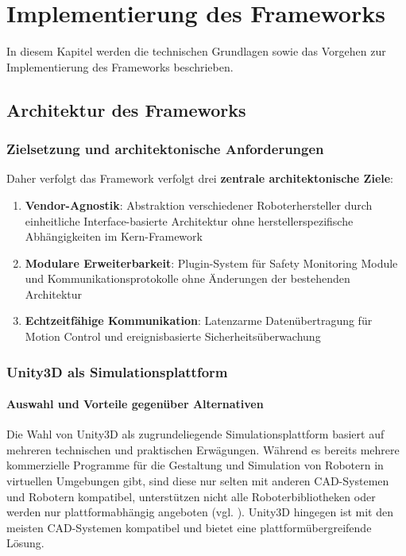 \chapter{Implementierung des Frameworks}
\label{cap:framework}
In diesem Kapitel werden die technischen Grundlagen sowie das Vorgehen zur Implementierung des Frameworks beschrieben.

\section{Architektur des Frameworks}
\label{sec:architektur_frameowork}

\subsection{Zielsetzung und architektonische Anforderungen}

Daher verfolgt das Framework verfolgt drei \textbf{zentrale architektonische
    Ziele}:

\begin{enumerate}
    \item \textbf{Vendor-Agnostik}: Abstraktion verschiedener Roboterhersteller durch einheitliche Interface-basierte Architektur ohne herstellerspezifische Abhängigkeiten im Kern-Framework

    \item \textbf{Modulare Erweiterbarkeit}: Plugin-System für Safety Monitoring Module und Kommunikationsprotokolle ohne Änderungen der bestehenden Architektur

    \item \textbf{Echtzeitfähige Kommunikation}: Latenzarme Datenübertragung für Motion Control und ereignisbasierte Sicherheitsüberwachung
\end{enumerate}

\subsection{Unity3D als Simulationsplattform}

\subsubsection{Auswahl und Vorteile gegenüber Alternativen}

Die Wahl von Unity3D als zugrundeliegende Simulationsplattform basiert auf
mehreren technischen und praktischen Erwägungen. Während es bereits mehrere
kommerzielle Programme für die Gestaltung und Simulation von Robotern in
virtuellen Umgebungen gibt, sind diese nur selten mit anderen CAD-Systemen und
Robotern kompatibel, unterstützen nicht alle Roboterbibliotheken oder werden
nur plattformabhängig angeboten (vgl. \cite[S. 247]{andaluz2016}). Unity3D
hingegen ist mit den meisten CAD-Systemen kompatibel und bietet eine
plattformübergreifende Lösung.

